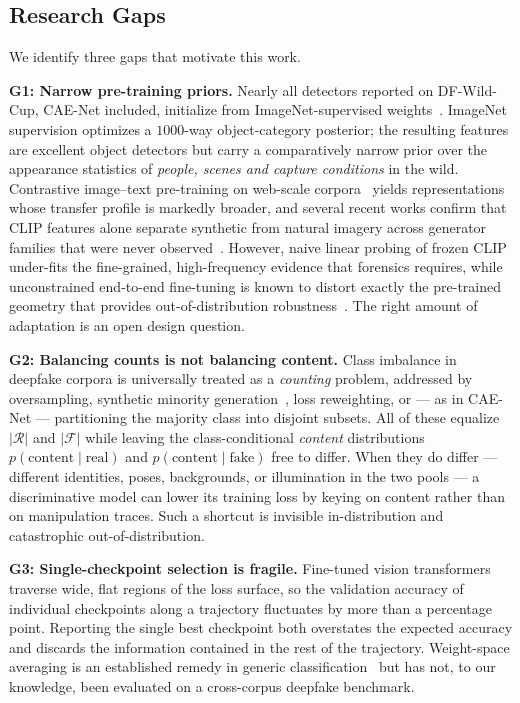\documentclass[10pt,journal]{IEEEtran}
\begin{document}
\subsection{Research Gaps}
We identify three gaps that motivate this work.

\textbf{G1: Narrow pre-training priors.} Nearly all detectors reported on
DF-Wild-Cup, CAE-Net included, initialize from ImageNet-supervised
weights~\cite{deng2009imagenet}. ImageNet supervision optimizes a
$1000$-way object-category posterior; the resulting features are excellent
object detectors but carry a comparatively narrow prior over the appearance
statistics of \emph{people, scenes and capture conditions} in the wild.
Contrastive image--text pre-training on web-scale
corpora~\cite{radford2021clip,cherti2023openclip,schuhmann2022laion5b} yields
representations whose transfer profile is markedly broader, and several recent
works confirm that CLIP features alone separate synthetic from natural imagery
across generator families that were never
observed~\cite{ojha2023universal,cozzolino2024raising,khan2024clipping}.
However, naive linear probing of frozen CLIP under-fits the fine-grained,
high-frequency evidence that forensics requires, while unconstrained
end-to-end fine-tuning is known to distort exactly the pre-trained geometry
that provides out-of-distribution robustness~\cite{kumar2022finetuning}. The
right amount of adaptation is an open design question.

\textbf{G2: Balancing counts is not balancing content.} Class imbalance in
deepfake corpora is universally treated as a \emph{counting} problem, addressed
by oversampling, synthetic minority generation~\cite{chawla2002smote}, loss
reweighting, or --- as in CAE-Net --- partitioning the majority class into
disjoint subsets. All of these equalize $|\mathcal{R}|$ and $|\mathcal{F}|$
while leaving the class-conditional \emph{content} distributions
$p(\text{content}\mid\text{real})$ and $p(\text{content}\mid\text{fake})$
free to differ. When they do differ --- different identities, poses,
backgrounds, or illumination in the two pools --- a discriminative model can
lower its training loss by keying on content rather than on manipulation
traces. Such a shortcut is invisible in-distribution and catastrophic
out-of-distribution.

\textbf{G3: Single-checkpoint selection is fragile.} Fine-tuned vision
transformers traverse wide, flat regions of the loss surface, so the
validation accuracy of individual checkpoints along a trajectory fluctuates by
more than a percentage point. Reporting the single best checkpoint both
overstates the expected accuracy and discards the information contained in the
rest of the trajectory. Weight-space averaging is an established remedy in
generic
classification~\cite{izmailov2018swa,wortsman2022soups} but has not, to our
knowledge, been evaluated on a cross-corpus deepfake benchmark.
\end{document}
